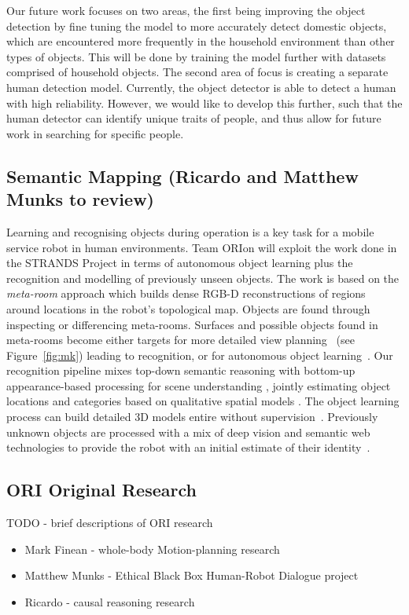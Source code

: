 \documentclass[runningheads,a4paper]{llncs}
\newcommand{\teamori}{Team ORIon}
\begin{document}
Our future work focuses on two areas, the first being improving the object detection by fine tuning the model to more accurately detect domestic objects, which are encountered more frequently in the household environment than other types of objects. This will be done by training the model further with datasets comprised of household objects. The second area of focus is creating a separate human detection model. Currently, the object detector is able to detect a human with high reliability. However, we would like to develop this further, such that the human detector can identify unique traits of people, and thus allow for future work in searching for specific people.


\subsection{Semantic Mapping (Ricardo and Matthew Munks to review)}

Learning and recognising objects during operation is a key task for a mobile service robot in human environments. \teamori{} will exploit the work done in the STRANDS Project in terms of autonomous object learning plus the recognition and modelling of previously unseen objects. The work is based on the \emph{meta-room} approach which builds dense RGB-D reconstructions of regions around locations in the robot's topological map. Objects are found through inspecting or differencing meta-rooms. Surfaces and possible objects found in meta-rooms become either targets for more detailed view planning~\cite{kunze14indirect} (see Figure~\ref{fig:mk}) leading to recognition, or for autonomous object learning~\cite{Faeulhammer:2016}. Our recognition pipeline mixes top-down semantic reasoning with bottom-up appearance-based processing for scene understanding \cite{kunze14topdown}, jointly estimating object locations and categories based on qualitative spatial models \cite{kunze14bootstrapping}. The object learning process can build detailed 3D models entire without supervision~\cite{Faeulhammer:2016}. Previously unknown  objects are processed with a mix of deep vision and semantic web technologies to provide the robot with an initial estimate of their identity~\cite{aloof@icra17}.

\subsection{ORI Original Research}
TODO - brief descriptions of ORI research
\begin{itemize}
	\item Mark Finean - whole-body Motion-planning research
	\item Matthew Munks - Ethical Black Box Human-Robot Dialogue project
	\item Ricardo - causal reasoning research
\end{itemize}
\end{document}

